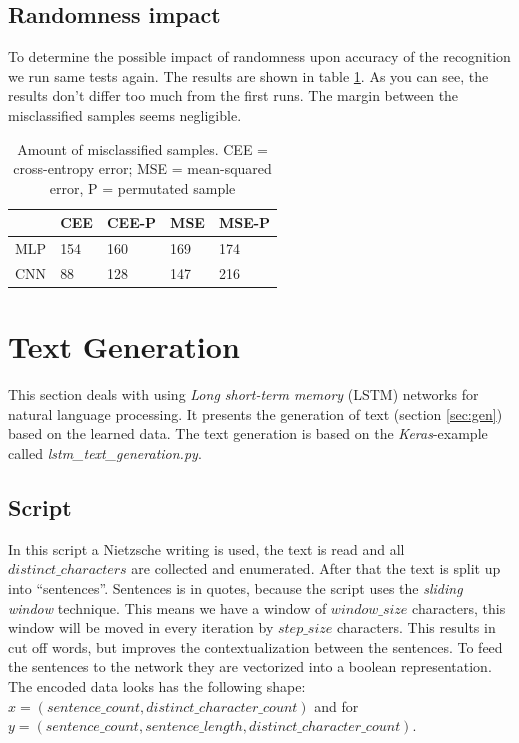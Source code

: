 \documentclass{article}[]
\begin{document}
\subsection{Randomness impact}
To determine the possible impact of randomness upon accuracy of the recognition we run same tests again.
The results are shown in table \ref{table-2}.
As you can see, the results don't differ too much from the first runs.
The margin between the misclassified samples seems negligible.


\begin{table}[H]
	\centering
	\begin{tabular}{|l|l|l|l|l|}
		\hline
		& \cellcolor[HTML]{C0C0C0}CEE & \cellcolor[HTML]{C0C0C0}CEE-P & \cellcolor[HTML]{C0C0C0}MSE & \cellcolor[HTML]{C0C0C0}MSE-P \\ \hline
		\cellcolor[HTML]{C0C0C0}MLP & \cellcolor[HTML]{FFFFFF}154 & 160                           & 169                         & 174                           \\ \hline
		\cellcolor[HTML]{C0C0C0}CNN & 88                          & 128                           & 147                         & 216                           \\ \hline
	\end{tabular}
	\caption{Amount of misclassified samples. CEE = cross-entropy error; MSE = mean-squared error, P = permutated sample}
	\label{table-2}
\end{table}

\section{Text Generation}
\label{sec:seq}
This section deals with using  \emph{Long short-term memory} (LSTM) networks for natural language processing.
It presents the generation of text (section \ref{sec:gen}) based on the learned data.
The text generation is based on the \textit{Keras}-example called \textit{lstm\_text\_generation.py}\cite{kerasexamples}.


\subsection{Script}
In this script a Nietzsche writing is used, the text is read and all $distinct\_characters$ are collected and enumerated.
After that the text is split up into \enquote{sentences}.
Sentences is in quotes, because the script uses the \emph{sliding window} technique.
This means we have a window of $window\_size$ characters, this window will be moved in every iteration by $step\_size$ characters.
This results in cut off words, but improves the contextualization between the sentences.
To feed the sentences to the network they are vectorized into a boolean representation.
The encoded data looks has the following shape:  $x=(sentence\_count, distinct\_character\_count)$ and for $y=(sentence\_count, sentence\_length, distinct\_character\_count)$.
\end{document}
